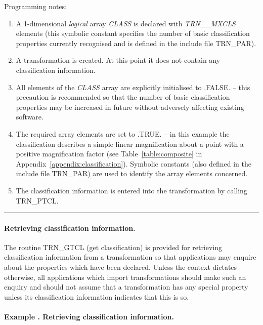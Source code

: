 \documentclass[twoside,11pt]{article}
\newcommand{\name}[1]{\mbox{\small{#1}}}
\newcommand{\fortvar}[1]{\mbox{\emph{#1}}}
\newcounter{examplecounter}
\newcommand{\example}[1]{\addtocounter{examplecounter}{1}
                         \paragraph{\textbf{Example \theexamplecounter. #1}}}
\newcommand{\exampledone}[0]{\begin{center} \rule{6em}{0.2mm} \end{center}}
\begin{document}
Programming notes: 

\begin{enumerate} 

\item A 1-dimensional {\em logical} array \fortvar{CLASS} is declared with
\fortvar{TRN\_\_MXCLS} elements (this symbolic constant specifies the number
of basic classification properties currently recognised and is defined in
the include file \name{TRN\_PAR}). 

\item A transformation is created.
At this point it does not contain any classification information. 

\item All elements of the \fortvar{CLASS} array are explicitly initialised
to \name{.FALSE.} -- this precaution is recommended so that the number of
basic classification properties may be increased in future without adversely
affecting existing software. 

\item The required array elements are set to \name{.TRUE.} -- in this
example the classification describes a simple linear magnification about a
point with a positive magnification factor (see Table~\ref{table:composite}
in Appendix~\ref{appendix:classification}). 
Symbolic constants (also defined in the include file \name{TRN\_PAR}) are
used to identify the array elements concerned. 

\item The classification information is entered into the transformation by
calling \name{TRN\_PTCL}. 

\end{enumerate}
\exampledone 

\paragraph{Retrieving classification information.}
The routine \name{TRN\_GTCL} (get classification) is provided for retrieving
classification information from a transformation so that applications may
enquire about the properties which have been declared.
Unless the context dictates otherwise, all applications which import
transformations should make such an enquiry and should not assume that a
transformation has any special property unless its classification
information indicates that this is so. 

\example{Retrieving classification information.} 
\end{document}
